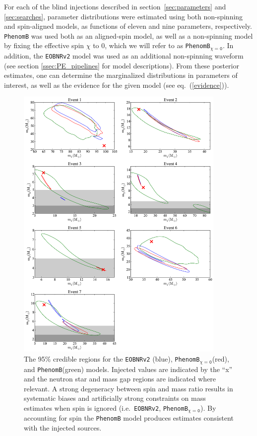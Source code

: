 \documentclass[12pt]{iopart}
\newcommand{\eob}{\texttt{EOBNRv2}\xspace}
\newcommand{\imr}{\texttt{PhenomB}\xspace}
\newcommand{\imrns}{\texttt{PhenomB$_\mathtt{\chi=0}$}\xspace}
\begin{document}
For each of the blind injections described in section~\ref{sec:parameters} and 
\ref{sec:searches}, parameter distributions were estimated using both 
non-spinning and spin-aligned models, as functions of eleven and nine 
parameters, respectively.  \imr was used both
as an aligned-spin model, as well as a non-spinning model by fixing the
effective spin $\chi$ to 0, which we will refer to as \imrns.  In addition, the
\eob model was used as an additional non-spinning waveform (see
section \ref{ssec:PE_pipelines} for model descriptions).  From these posterior
estimates, one can determine the marginalized distributions in
parameters of interest, as well as the evidence for the given model
(see eq.~(\ref{evidence})).

\begin{figure}[t] 
  \includegraphics[width=0.9\textwidth]{figure6}
  \caption{\label{fig:PE_comp_mass} The 95\% credible regions for the \eob
      (blue), \imrns (red), and \imr (green) models.  Injected values are
      indicated by the ``x'' and the neutron star and mass gap regions are
      indicated where relevant.  A strong degeneracy between spin and mass
      ratio results in systematic biases and artificially strong constraints on
      mass estimates when spin is ignored (i.e.\ \eob, \imrns).  By accounting
      for spin the \imr model produces estimates consistent with the injected
      sources.}
\end{figure}
\end{document}
